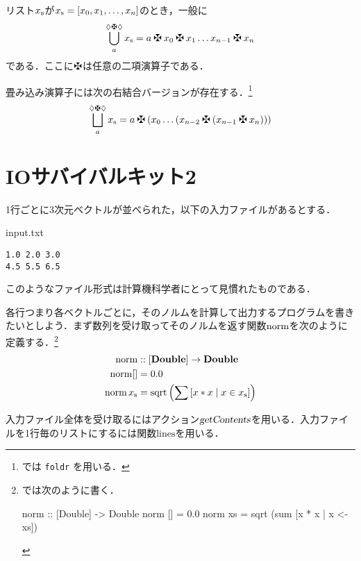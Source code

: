 \documentclass[platex,a5paper,twoside,fleqn,draft]{jsbook}
\begin{document}
リスト${x}_\mathrm{s}$が${x}_\mathrm{s}=[x_0,x_1,\dots,x_n]$のとき，一般に
\begin{equation}
\mathFold{a}{\mathAnonymousParameter\mathAnonymousOperator\mathAnonymousParameter}{\mathList{x}}
=a\mathAnonymousOperator x_0\mathAnonymousOperator x_1\dots x_{n-1}\mathAnonymousOperator x_n
\end{equation}
である．ここに$\mathAnonymousOperator$は任意の二項演算子である．

畳み込み演算子には次の右結合バージョンが存在する．\footnote{\haskell では \verb|foldr| を用いる．}
\begin{equation}
\mathFoldRight{a}{\mathAnonymousParameter\mathAnonymousOperator\mathAnonymousParameter}{\mathList{x}}
=a\mathAnonymousOperator\left(x_0\dots\left(x_{n-2}\mathAnonymousOperator\left(x_{n-1}\mathAnonymousOperator x_n\right)\right)\right)
\end{equation}

\section{IOサバイバルキット2}

1行ごとに3次元ベクトルが並べられた，以下の入力ファイルがあるとする．
\begin{sourcecode}{input.txt}
\begin{verbatim}
1.0 2.0 3.0
4.5 5.5 6.5
\end{verbatim}
\end{sourcecode}
このようなファイル形式は計算機科学者にとって見慣れたものである．

各行つまり各ベクトルごとに，そのノルムを計算して出力するプログラムを書きたいとしよう．まず数列を受け取ってそのノルムを返す関数$\mathop{\textrm{norm}}$を次のように定義する．\footnote{\haskell では次のように書く．
\begin{footcode}
      norm :: [Double] -> Double
      norm [] = 0.0
      norm xs = sqrt (sum [x * x | x <- xs])
\end{footcode}}
\begin{align}
\mathop{\textrm{norm}}&::[\mathord{\mathbf{Double}}]\rightarrow\mathord{\mathbf{Double}}\\
\mathop{\textrm{norm}}[]&=0.0\\
\mathop{\textrm{norm}}{x}_\mathrm{s}&=\mathop{\textrm{sqrt}}\left(\sum\left[x*x\mid x\in{x}_\mathrm{s}\right]\right)
\end{align}

入力ファイル全体を受け取るにはアクション$\textsl{getContents}$を用いる．入力ファイルを1行毎のリストにするには関数$\textrm{lines}$を用いる．
\end{document}
